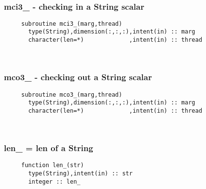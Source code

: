  
\mbox{}\hrulefill\ 

  \subsubsection{mci3\_ - checking in a String scalar}

\begin{verbatim} 
     subroutine mci3_(marg,thread)
       type(String),dimension(:,:,:),intent(in) :: marg
       character(len=*)             ,intent(in) :: thread
 \end{verbatim}%
 
 
\mbox{}\hrulefill\ 
 
  \subsubsection{mco3\_ - checking out a String scalar}

\begin{verbatim} 
     subroutine mco3_(marg,thread)
       type(String),dimension(:,:,:),intent(in) :: marg
       character(len=*)             ,intent(in) :: thread
 \end{verbatim}%
 
 
\mbox{}\hrulefill\ 
 
  \subsubsection{len\_ = len of a String}

\begin{verbatim} 
     function len_(str)
       type(String),intent(in) :: str
       integer :: len_
 \end{verbatim}%
 
